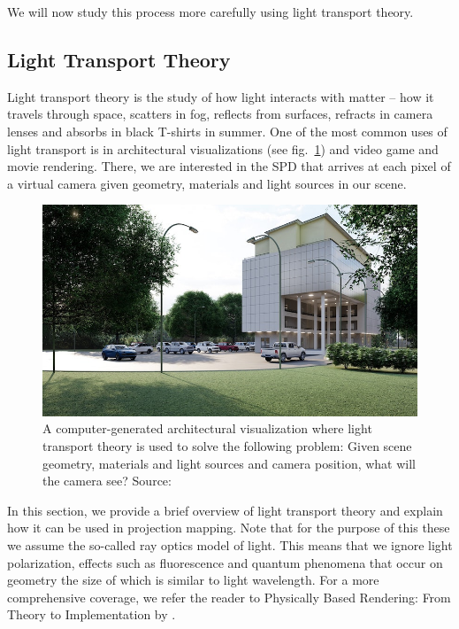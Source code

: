We will now study this process more carefully using light transport theory.

\subsection{Light Transport Theory}
\label{section:background-projection_mapping-light_transport}

Light transport theory is the study of how light interacts with matter -- how it travels through space, scatters in fog, reflects from surfaces, refracts in camera lenses and absorbs in black T-shirts in summer. One of the most common uses of light transport is in architectural visualizations (see fig.~\ref{fig:background_light_transport_examples-rendering}) and video game and movie rendering. There, we are interested in the SPD that arrives at each pixel of a virtual camera given geometry, materials and light sources in our scene.

\begin{figure}
    \centering
    \includegraphics[width=\textwidth]{images/02-rendering.jpg}
    \caption{A computer-generated architectural visualization where light transport theory is used to solve the following problem: Given scene geometry, materials and light sources and camera position, what will the camera see? Source: \citet{ImageRendering}}
    \label{fig:background_light_transport_examples-rendering}
\end{figure}

In this section, we provide a brief overview of light transport theory and explain how it can be used in projection mapping. Note that for the purpose of this these we assume the so-called ray optics model of light. This means that we ignore light polarization, effects such as fluorescence and quantum phenomena that occur on geometry the size of which is similar to light wavelength. For a more comprehensive coverage, we refer the reader to Physically Based Rendering: From Theory to Implementation by \citet{PBRT3e}.

